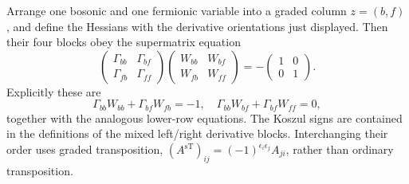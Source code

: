 \begin{enumerate}
\begin{enumerate}
    Arrange one bosonic and one fermionic variable into a graded column
    \(z=(b,f)\), and define the Hessians with the derivative orientations
    just displayed.  Then their four blocks obey the supermatrix equation
    \[
      \begin{pmatrix}
        \Gamma_{bb}&\Gamma_{bf}\\
        \Gamma_{fb}&\Gamma_{ff}
      \end{pmatrix}
      \begin{pmatrix}
        W_{bb}&W_{bf}\\
        W_{fb}&W_{ff}
      \end{pmatrix}
      =-\begin{pmatrix}1&0\\0&1\end{pmatrix}.
    \]
    Explicitly these are
    \[
      \Gamma_{bb}W_{bb}+\Gamma_{bf}W_{fb}=-1,\quad
      \Gamma_{bb}W_{bf}+\Gamma_{bf}W_{ff}=0,
    \]
    together with the analogous lower-row equations.  The Koszul signs are
    contained in the definitions of the mixed left/right derivative blocks.
    Interchanging their order uses graded transposition,
    \((A^{\mathrm{sT}})_{ij}=(-1)^{\epsilon_i\epsilon_j}A_{ji}\),
    rather than ordinary transposition.
  \end{enumerate}


\end{enumerate}
